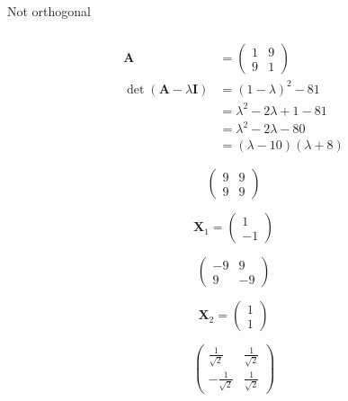 \documentclass{article}
\begin{document}
\setcounter{subsubsection}{8}
\subsubsection{}

Not orthogonal

\setcounter{subsubsection}{10}
\subsubsection{}

\begin{align*}
  \mathbf{A}                             & = \begin{pmatrix}
                                               1 & 9 \\
                                               9 & 1
                                             \end{pmatrix}                 \\
  \det (\mathbf{A} - \lambda \mathbf{I}) & = (1 - \lambda)^2 - 81           \\
                                         & = \lambda^2 - 2 \lambda + 1 - 81 \\
                                         & = \lambda^2 - 2 \lambda - 80     \\
                                         & = (\lambda - 10) (\lambda + 8)
\end{align*}

\[\begin{pmatrix}
    9 & 9 \\
    9 & 9
  \end{pmatrix}\]

\[\mathbf{X}_1 = \begin{pmatrix}
    1 \\
    -1
  \end{pmatrix}\]

\[\begin{pmatrix}
    -9 & 9  \\
    9  & -9
  \end{pmatrix}\]

\[\mathbf{X}_2 = \begin{pmatrix}
    1 \\
    1
  \end{pmatrix}\]

\[\begin{pmatrix}
    \frac{1}{\sqrt{2}}  & \frac{1}{\sqrt{2}} \\
    -\frac{1}{\sqrt{2}} & \frac{1}{\sqrt{2}}
  \end{pmatrix}\]
\end{document}
